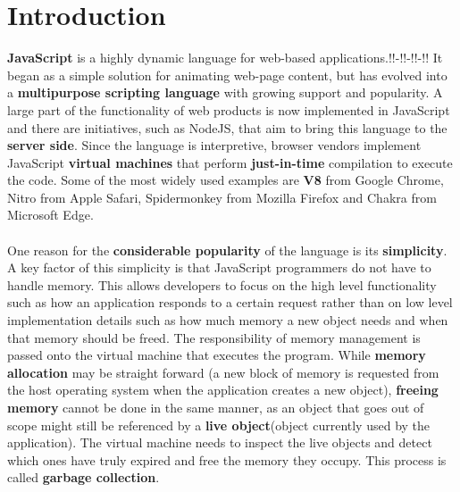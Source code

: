 \documentclass{l4proj}
\begin{document}
\chapter{Introduction}
\hspace*{3em} \textbf{JavaScript} is a highly dynamic language for web-based applications.\cite{intro}!!-!!-!!-!!%
 It began as a simple solution for animating web-page content, but has evolved into a \textbf{multipurpose scripting language} with growing support and popularity. A large part of the functionality of web products is now implemented in JavaScript and there are initiatives, such as NodeJS\cite{nodejs}, that aim to bring this language to the \textbf{server side}. Since the language is interpretive, browser vendors implement JavaScript \textbf{virtual machines} that perform \textbf{just-in-time} compilation to execute the code. Some of the most widely used examples are \textbf{V8} from Google Chrome\cite{v8}, Nitro from Apple Safari, Spidermonkey\cite{spidermk} from Mozilla Firefox and Chakra\cite{chakra} from Microsoft Edge.
\\\\%
\hspace*{3em} One reason for the \textbf{considerable popularity} of the language is its \textbf{simplicity}. A key factor of this simplicity is that JavaScript programmers do not have to handle memory. This allows developers to focus on the high level functionality such as how an application responds to a certain request rather than on low level implementation details such as how much memory a new object needs and when that memory should be freed. The responsibility of memory management is passed onto the virtual machine that executes the program. While \textbf{memory allocation} may be straight forward (a new block of memory is requested from the host operating system when the application creates a new object), \textbf{freeing memory} cannot be done in the same manner, as an object that goes out of scope might still be referenced by a \textbf{live object}(object currently used by the application). The virtual machine needs to inspect the live objects and detect which ones have truly expired and free the memory they occupy. This process is called \textbf{garbage collection}.
\\\\%
\end{document}
